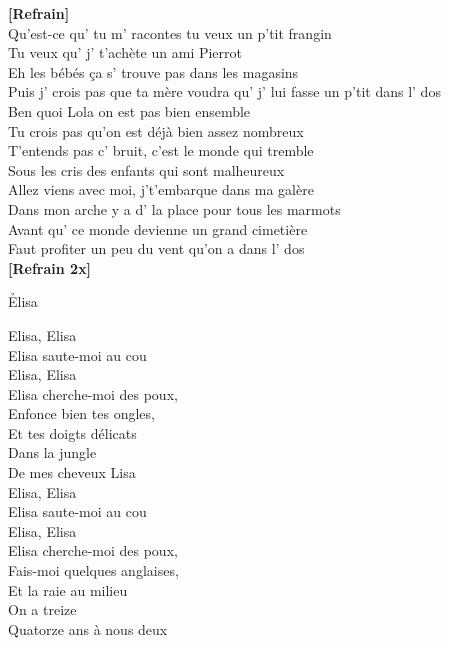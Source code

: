 \documentclass{novel}
\begin{document}
{\begin{minipage}[t][0.4\textheight][t]{\textwidth}
\begin{multicols}{2}
\textbf{[Refrain]} \\

Qu'est-ce qu' tu m' racontes tu veux un p'tit frangin \\
Tu veux qu' j' t'achète un ami Pierrot \\
Eh les bébés ça s' trouve pas dans les magasins \\
Puis j' crois pas que ta mère voudra qu' j' lui fasse un p'tit dans l' dos \\
Ben quoi Lola on est pas bien ensemble \\
Tu crois pas qu'on est déjà bien assez nombreux \\
T'entends pas c' bruit, c'est le monde qui tremble \\
Sous les cris des enfants qui sont malheureux \\
Allez viens avec moi, j't'embarque dans ma galère \\
Dans mon arche y a d' la place pour tous les marmots \\
Avant qu' ce monde devienne un grand cimetière \\
Faut profiter un peu du vent qu'on a dans l' dos \\

\textbf{[Refrain 2x]}

\end{multicols}
\end{minipage}

\vspace{0.09\textheight}
\begin{minipage}[t][0.55\textheight][t]{\textwidth}
\h*{Elisa}
\begin{multicols}{2}
\scriptsize
Elisa, Elisa \\
Elisa saute-moi au cou \\
Elisa, Elisa \\
Elisa cherche-moi des poux, \\
Enfonce bien tes ongles, \\
Et tes doigts délicats \\
Dans la jungle \\
De mes cheveux Lisa \\

Elisa, Elisa \\
Elisa saute-moi au cou \\
Elisa, Elisa \\
Elisa cherche-moi des poux, \\
Fais-moi quelques anglaises, \\
Et la raie au milieu \\
On a treize \\
Quatorze ans à nous deux \\


\end{multicols}
\end{minipage}}
\end{document}
